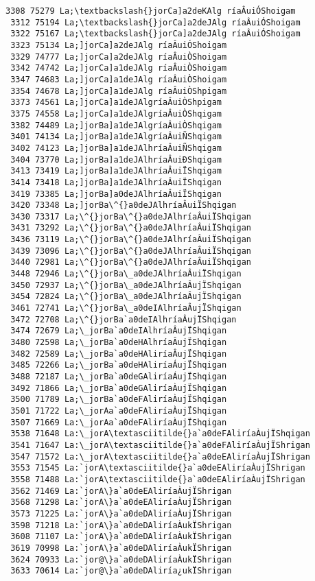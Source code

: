 \documentclass[11pt]{article}
\begin{document}
\begin{Verbatim}[commandchars=\\\{\}]
 3308 75279 La;\textbackslash{}jorCa]a2deKAlg ríaÂuiÓShoigam
 3312 75194 La;\textbackslash{}jorCa]a2deJAlg ríaÂuiÓShoigam
 3322 75167 La;\textbackslash{}jorCa]a2deJAlg ríaÂuiÓShoigam
 3323 75134 La;]jorCa]a2deJAlg ríaÂuiÓShoigam
 3329 74777 La;]jorCa]a2deJAlg ríaÂuiÒShoigam
 3342 74742 La;]jorCa]a1deJAlg ríaÂuiÒShoigam
 3347 74683 La;]jorCa]a1deJAlg ríaÂuiÒShoigam
 3354 74678 La;]jorCa]a1deJAlg ríaÂuiÒShpigam
 3373 74561 La;]jorCa]a1deJAlgríaÂuiÒShpigam
 3375 74558 La;]jorCa]a1deJAlgríaÂuiÒShqigam
 3382 74489 La;]jorBa]a1deJAlgríaÂuiÒShqigam
 3401 74134 La;]jorBa]a1deJAlgríaÂuiÑShqigam
 3402 74123 La;]jorBa]a1deJAlhríaÂuiÑShqigam
 3404 73770 La;]jorBa]a1deJAlhríaÂuiÐShqigam
 3413 73419 La;]jorBa]a1deJAlhríaÂuiÏShqigam
 3414 73418 La;]jorBa]a1deJAlhríaÂuiÏShqigan
 3419 73385 La;]jorBa]a0deJAlhríaÂuiÏShqigan
 3420 73348 La;]jorBa\^{}a0deJAlhríaÂuiÏShqigan
 3430 73317 La;\^{}jorBa\^{}a0deJAlhríaÂuiÏShqigan
 3431 73292 La;\^{}jorBa\^{}a0deJAlhríaÂuiÏShqigan
 3436 73119 La;\^{}jorBa\^{}a0deJAlhríaÂuiÏShqigan
 3439 73096 La;\^{}jorBa\^{}a0deJAlhríaÂuiÏShqigan
 3440 72981 La;\^{}jorBa\^{}a0deJAlhríaÂuiÏShqigan
 3448 72946 La;\^{}jorBa\_a0deJAlhríaÂuiÏShqigan
 3450 72937 La;\^{}jorBa\_a0deJAlhríaÂujÏShqigan
 3454 72824 La;\^{}jorBa\_a0deJAlhríaÂujÏShqigan
 3461 72741 La;\^{}jorBa\_a0deIAlhríaÂujÏShqigan
 3472 72708 La;\^{}jorBa`a0deIAlhríaÂujÏShqigan
 3474 72679 La;\_jorBa`a0deIAlhríaÂujÏShqigan
 3480 72598 La;\_jorBa`a0deHAlhríaÂujÏShqigan
 3482 72589 La;\_jorBa`a0deHAliríaÂujÏShqigan
 3485 72266 La;\_jorBa`a0deHAliríaÁujÏShqigan
 3488 72187 La;\_jorBa`a0deGAliríaÁujÏShqigan
 3492 71866 La;\_jorBa`a0deGAliríaÀujÏShqigan
 3500 71789 La;\_jorBa`a0deFAliríaÀujÏShqigan
 3501 71722 La;\_jorAa`a0deFAliríaÀujÏShqigan
 3507 71669 La:\_jorAa`a0deFAliríaÀujÏShqigan
 3538 71648 La:\_jorA\textasciitilde{}a`a0deFAliríaÀujÏShqigan
 3541 71647 La:\_jorA\textasciitilde{}a`a0deFAliríaÀujÏShrigan
 3547 71572 La:\_jorA\textasciitilde{}a`a0deEAliríaÀujÏShrigan
 3553 71545 La:`jorA\textasciitilde{}a`a0deEAliríaÀujÏShrigan
 3558 71488 La:`jorA\textasciitilde{}a`a0deEAliríaÀujÏShrigan
 3562 71469 La:`jorA\}a`a0deEAliríaÀujÏShrigan
 3568 71298 La:`jorA\}a`a0deEAliríaÀujÏShrigan
 3573 71225 La:`jorA\}a`a0deDAliríaÀujÏShrigan
 3598 71218 La:`jorA\}a`a0deDAliríaÀukÏShrigan
 3608 71107 La:`jorA\}a`a0deDAliríaÀukÏShrigan
 3619 70998 La:`jorA\}a`a0deDAliríaÀukÏShrigan
 3624 70933 La:`jor@\}a`a0deDAliríaÀukÏShrigan
 3633 70614 La:`jor@\}a`a0deDAliría¿ukÏShrigan

\end{Verbatim}
\end{document}
